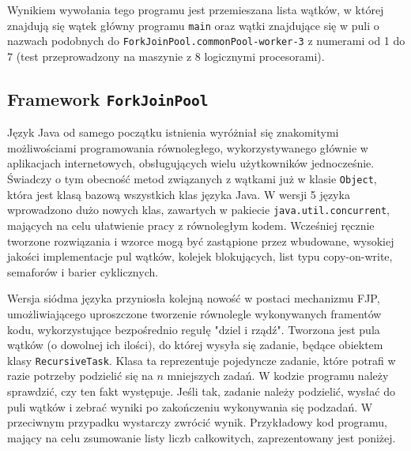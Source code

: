 \documentclass[12pt]{extarticle}
\begin{document}
    Wynikiem wywołania tego programu jest przemieszana lista wątków, w której znajdują się wątek główny programu \texttt{main} oraz wątki znajdujące się w puli o nazwach podobnych do \texttt{ForkJoinPool.commonPool-worker-3} z numerami od 1 do 7 (test przeprowadzony na maszynie z 8 logicznymi procesorami).

\subsection{Framework \texttt{ForkJoinPool}}

    Język Java od samego początku istnienia wyróżniał się znakomitymi możliwościami programowania równoległego, wykorzystywanego głównie w aplikacjach internetowych, obsługujących wielu użytkowników jednocześnie. Świadczy o tym obecność metod związanych z wątkami już w klasie \texttt{Object}, która jest klasą bazową wszystkich klas języka Java. W wersji 5 języka wprowadzono dużo nowych klas, zawartych w pakiecie \texttt{java.util.concurrent}, mających na celu ułatwienie pracy z równoległym kodem. Wcześniej ręcznie tworzone rozwiązania i wzorce mogą być zastąpione przez wbudowane, wysokiej jakości implementacje pul wątków, kolejek blokujących, list typu copy-on-write, semaforów i barier cyklicznych.
    
    Wersja siódma języka przyniosła kolejną nowość w postaci mechanizmu FJP, umożliwiającego uproszczone tworzenie równolegle wykonywanych framentów kodu, wykorzystujące bezpośrednio regułę "dziel i rządź". Tworzona jest pula wątków (o dowolnej ich ilości), do której wysyła się zadanie, będące obiektem klasy \texttt{RecursiveTask}. Klasa ta reprezentuje pojedyncze zadanie, które potrafi w razie potrzeby podzielić się na $ n $ mniejszych zadań. W kodzie programu należy sprawdzić, czy ten fakt występuje. Jeśli tak, zadanie należy podzielić, wysłać do puli wątków i zebrać wyniki po zakończeniu wykonywania się podzadań. W przeciwnym przypadku wystarczy zwrócić wynik. Przykładowy kod programu, mający na celu zsumowanie listy liczb całkowitych, zaprezentowany jest poniżej. 
\end{document}
